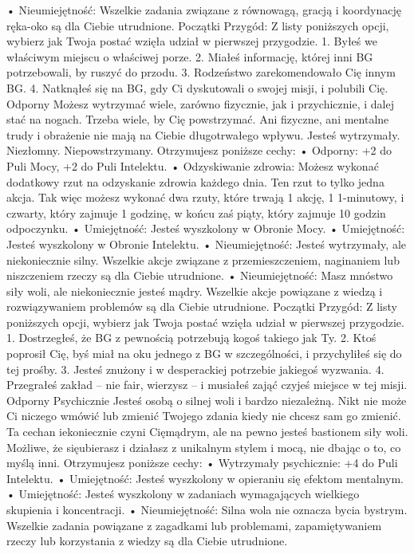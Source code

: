     • Nieumiejętność: Wszelkie zadania związane z równowagą, gracją i koordynację ręka-oko są dla Ciebie utrudnione. 
Początki Przygód: Z listy poniższych opcji, wybierz jak Twoja postać wzięła udział w pierwszej przygodzie.
1. Byłeś we właściwym miejscu o właściwej porze.
2. Miałeś informację, której inni BG potrzebowali, by ruszyć do przodu.
3. Rodzeństwo zarekomendowało Cię innym BG.
4. Natknąłeś się na BG, gdy Ci dyskutowali o swojej misji, i polubili Cię.
Odporny
Możesz wytrzymać wiele, zarówno fizycznie, jak i przychicznie, i dalej stać na nogach. Trzeba wiele, by Cię powstrzymać. Ani fizyczne, ani mentalne trudy i obrażenie nie mają na Ciebie długotrwałego wpływu. Jesteś wytrzymały. Niezłomny. Niepowstrzymany. 
Otrzymujesz poniższe cechy:
    • Odporny: +2 do Puli Mocy, +2 do Puli Intelektu.
    • Odzyskiwanie zdrowia: Możesz wykonać dodatkowy rzut na odzyskanie zdrowia każdego dnia. Ten rzut to tylko jedna akcja. Tak więc możesz wykonać dwa rzuty, które trwają 1 akcję, 1 1-minutowy, i czwarty, który zajmuje 1 godzinę, w końcu zaś piąty, który zajmuje 10 godzin odpoczynku.
    • Umiejętność: Jesteś wyszkolony w Obronie Mocy.
    • Umiejętność: Jesteś wyszkolony w Obronie Intelektu.
    • Nieumiejętność: Jesteś wytrzymały, ale niekoniecznie silny. Wszelkie akcje związane z przemieszczeniem, naginaniem lub niszczeniem rzeczy są dla Ciebie utrudnione.
    • Nieumiejętność: Masz mnóstwo siły woli, ale niekoniecznie jesteś mądry. Wszelkie akcje powiązane z wiedzą i rozwiązywaniem problemów są dla Ciebie utrudnione.
Początki Przygód: Z listy poniższych opcji, wybierz jak Twoja postać wzięła udział w pierwszej przygodzie.
1. Dostrzegłeś, że BG z pewnością potrzebują kogoś takiego jak Ty.
2. Ktoś poprosił Cię, byś miał na oku jednego z BG w szczególności, i przychyliłeś się do tej prośby.
3. Jesteś znużony i w desperackiej potrzebie jakiegoś wyzwania.
4. Przegrałeś zakład – nie fair, wierzysz – i musiałeś zająć czyjeś miejsce w tej misji.
Odporny Psychicznie
Jesteś osobą o silnej woli i bardzo niezależną. Nikt nie może Ci niczego wmówić lub zmienić Twojego zdania kiedy nie chcesz sam go zmienić. Ta cechan iekoniecznie czyni Cięmądrym, ale na pewno jesteś bastionem siły woli. Możliwe, że sięubierasz i działasz z unikalnym stylem i mocą, nie dbając o to, co myślą inni. 
Otrzymujesz poniższe cechy:
    • Wytrzymały psychicznie: +4 do Puli Intelektu.
    • Umiejętność: Jesteś wyszkolony w opieraniu się efektom mentalnym.
    • Umiejętność: Jesteś wyszkolony w zadaniach wymagających wielkiego skupienia i koncentracji.
    • Nieumiejętność: Silna wola nie oznacza bycia bystrym. Wszelkie zadania powiązane z zagadkami lub problemami, zapamiętywaniem rzeczy lub korzystania z wiedzy są dla Ciebie utrudnione. 
